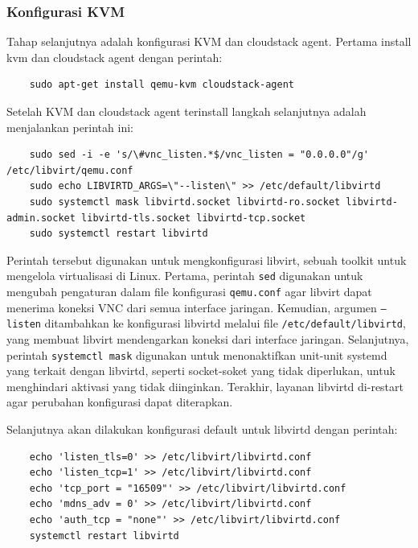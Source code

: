 \subsubsection{Konfigurasi KVM}
Tahap selanjutnya adalah konfigurasi KVM dan cloudstack agent. Pertama install kvm dan cloudstack agent dengan perintah:

\begin{verbatim}
    sudo apt-get install qemu-kvm cloudstack-agent
\end{verbatim}

Setelah KVM dan cloudstack agent terinstall langkah selanjutnya adalah menjalankan perintah ini:

\begin{listing}[H]
    \begin{verbatim}
    sudo sed -i -e 's/\#vnc_listen.*$/vnc_listen = "0.0.0.0"/g' /etc/libvirt/qemu.conf
    sudo echo LIBVIRTD_ARGS=\"--listen\" >> /etc/default/libvirtd
    sudo systemctl mask libvirtd.socket libvirtd-ro.socket libvirtd-admin.socket libvirtd-tls.socket libvirtd-tcp.socket
    sudo systemctl restart libvirtd
    \end{verbatim}
\end{listing}

Perintah tersebut digunakan untuk mengkonfigurasi libvirt, sebuah toolkit untuk mengelola virtualisasi di Linux. Pertama, perintah \texttt{sed} digunakan untuk mengubah pengaturan dalam file konfigurasi \texttt{qemu.conf} agar libvirt dapat menerima koneksi VNC dari semua interface jaringan. Kemudian, argumen \texttt{--listen} ditambahkan ke konfigurasi libvirtd melalui file \texttt{/etc/default/libvirtd}, yang membuat libvirt mendengarkan koneksi dari interface jaringan. Selanjutnya, perintah \texttt{systemctl mask} digunakan untuk menonaktifkan unit-unit systemd yang terkait dengan libvirtd, seperti socket-soket yang tidak diperlukan, untuk menghindari aktivasi yang tidak diinginkan. Terakhir, layanan libvirtd di-restart agar perubahan konfigurasi dapat diterapkan.

Selanjutnya akan dilakukan konfigurasi default untuk libvirtd dengan perintah:

\begin{listing}[H]
    \begin{verbatim}
    echo 'listen_tls=0' >> /etc/libvirt/libvirtd.conf
    echo 'listen_tcp=1' >> /etc/libvirt/libvirtd.conf
    echo 'tcp_port = "16509"' >> /etc/libvirt/libvirtd.conf
    echo 'mdns_adv = 0' >> /etc/libvirt/libvirtd.conf
    echo 'auth_tcp = "none"' >> /etc/libvirt/libvirtd.conf
    systemctl restart libvirtd
    \end{verbatim}
\end{listing}

